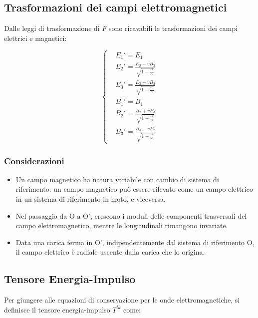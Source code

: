 \documentclass{article}
\begin{document}
\subsection{Trasformazioni dei campi elettromagnetici}
Dalle leggi di trasformazione di $F$ sono ricavabili le trasformazioni dei campi elettrici e magnetici:

\begin{equation}
    \left\{
    \begin{aligned}
         & E_1'=E_1                                       \\
         & E_2'=\frac{E_2-vB_3}{\sqrt{1-\frac{v^2}{c^2}}} \\
         & E_3'=\frac{E_3+vB_2}{\sqrt{1-\frac{v^2}{c^2}}} \\
         & B_1'=B_1                                       \\
         & B_2'=\frac{B_2+vE_3}{\sqrt{1-\frac{v^2}{c^2}}} \\
         & B_3'=\frac{B_3-vE_2}{\sqrt{1-\frac{v^2}{c^2}}}
    \end{aligned}
    \right.
\end{equation}


\subsubsection{Considerazioni}

\begin{itemize}
    \item Un campo magnetico ha natura variabile con cambio di sistema di riferimento: un campo magnetico può essere rilevato come un campo elettrico in un sistema di riferimento in moto, e viceversa.
    \item Nel passaggio da O a O', crescono i moduli delle componenti trasversali del campo elettromagnetico, mentre le longitudinali rimangono invariate.
    \item Data una carica ferma in O', indipendentemente dal sistema di riferimento O, il campo elettrico è radiale uscente dalla carica che lo origina.
\end{itemize}

\subsection{Tensore Energia-Impulso}
Per giungere alle equazioni di conservazione per le onde elettromagnetiche, si definisce il tensore
energia-impulso $T^{lk}$ come:
\end{document}
